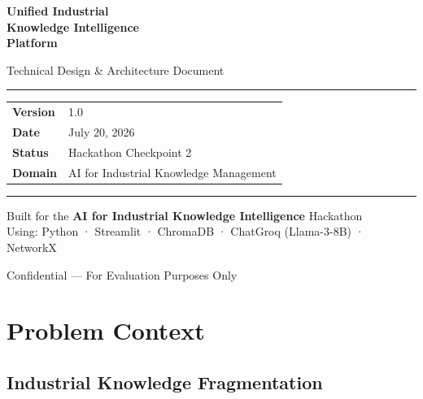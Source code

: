 \documentclass[12pt,a4paper]{article}
\begin{document}
\begin{titlepage}
  \centering
  \vspace*{2cm}

  {\Huge\bfseries\color{primaryblue}
    Unified Industrial\\[0.3em]
    Knowledge Intelligence\\[0.3em]
    Platform
  \par}

  \vspace{1em}
  {\Large\color{accentgray} Technical Design \& Architecture Document}

  \vspace{2.5cm}
  \rule{0.6\textwidth}{0.5pt}
  \vspace{1em}

  \begin{tabular}{ll}
    \textbf{Version}  & 1.0 \\[0.3em]
    \textbf{Date}     & July 20, 2026 \\[0.3em]
    \textbf{Status}   & Hackathon Checkpoint 2 \\[0.3em]
    \textbf{Domain}   & AI for Industrial Knowledge Management \\
  \end{tabular}

  \vspace{2.5cm}
  \rule{0.6\textwidth}{0.5pt}
  \vspace{1.5cm}

  {\large\color{accentgray}
    Built for the \textbf{AI for Industrial Knowledge Intelligence} Hackathon\\[0.5em]
    Using: Python · Streamlit · ChromaDB · ChatGroq (Llama-3-8B) · NetworkX
  }

  \vfill
  {\small\color{accentgray} Confidential --- For Evaluation Purposes Only}
\end{titlepage}

\tableofcontents
\newpage

\section{Problem Context}

\subsection{Industrial Knowledge Fragmentation}
\end{document}
